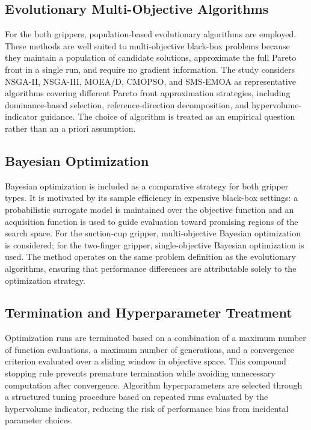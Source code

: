 \subsection{Evolutionary Multi-Objective Algorithms}

For the both grippers, population-based evolutionary algorithms are employed. These methods are well suited to multi-objective black-box
problems because they maintain a population of candidate solutions, approximate the full Pareto front in a single run, and require no gradient
information. The study considers NSGA-II, NSGA-III, MOEA/D, CMOPSO, and SMS-EMOA as representative algorithms covering different Pareto front
approximation strategies, including dominance-based selection, reference-direction decomposition, and hypervolume-indicator guidance. The choice of
algorithm is treated as an empirical question rather than an a priori assumption.

\subsection{Bayesian Optimization}

Bayesian optimization is included as a comparative strategy for both gripper types. It is motivated by its sample efficiency in expensive black-box
settings: a probabilistic surrogate model is maintained over the objective function and an acquisition function is used to guide evaluation toward
promising regions of the search space. For the suction-cup gripper, multi-objective Bayesian optimization is considered; for the two-finger gripper,
single-objective Bayesian optimization is used. The method operates on the same problem definition as the evolutionary algorithms, ensuring that
performance differences are attributable solely to the optimization strategy.

\subsection{Termination and Hyperparameter Treatment}

Optimization runs are terminated based on a combination of a maximum number of function evaluations, a maximum number of generations, and a
convergence criterion evaluated over a sliding window in objective space. This compound stopping rule prevents premature termination while avoiding
unnecessary computation after convergence. Algorithm hyperparameters are selected through a structured tuning procedure based on repeated runs
evaluated by the hypervolume indicator, reducing the risk of performance bias from incidental parameter choices.

